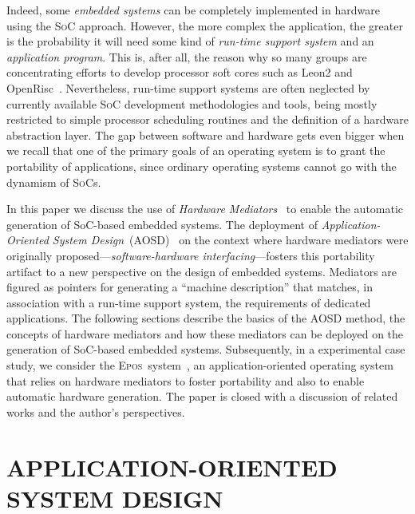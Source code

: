 \documentclass{kapproc} %
\begin{document}
 Indeed, some \emph{embedded systems} can be completely implemented in
 hardware using the \textsc{SoC} approach. However, the more complex
 the application, the greater is the probability it will need some
 kind of \emph{run-time support system} and an \emph{application
 program}. This is, after all, the reason why so many groups are
 concentrating efforts to develop processor soft cores such as Leon2
 and OpenRisc~\cite{Mattsson:2004}. Nevertheless, run-time support
 systems are often neglected by currently available \textsc{SoC}
 development methodologies and tools, being mostly restricted to
 simple processor scheduling routines and the definition of a hardware
 abstraction layer. The gap between software and hardware gets even
 bigger when we recall that one of the primary goals of an operating
 system is to grant the portability of applications, since ordinary
 operating systems cannot go with the dynamism of \textsc{SoC}s.

 In this paper we discuss the use of \emph{Hardware
 Mediators}~\cite{Polpeta:euc:2004} to enable the automatic generation
 of SoC-based embedded systems. The deployment of
 \emph{Application-Oriented System
 Design}~(AOSD)~\cite{Froehlich:2001} on the context where hardware
 mediators were originally proposed---\emph{software-hardware
 interfacing}---fosters this portability artifact to a new perspective
 on the design of embedded systems. Mediators are figured as pointers
 for generating a ``machine description'' that matches, in association
 with a run-time support system, the requirements of dedicated
 applications. The following sections describe the basics of the AOSD
 method, the concepts of hardware mediators and how these mediators
 can be deployed on the generation of SoC-based embedded
 systems. Subsequently, in a experimental case study, we consider the
 \textsc{Epos}~system~\cite{Froehlich:sbac:1999}, an
 application-oriented operating system that relies on hardware
 mediators to foster portability and also to enable automatic hardware
 generation. The paper is closed with a discussion of related works
 and the author's perspectives.

\section[APPLICATION-ORIENTED SYSTEM DESIGN]
{APPLICATION-ORIENTED SYSTEM DESIGN\label{aosd}}
\end{document}
